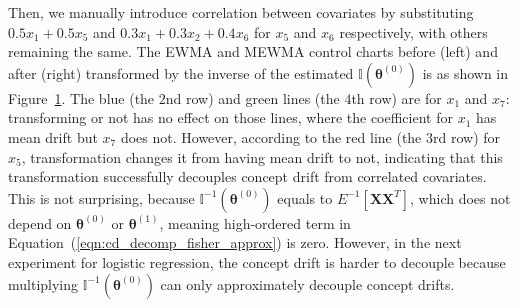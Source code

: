 \documentclass[twoside,11pt]{article}
\begin{document}
\begin{appendix}
\begin{figure}[!htbp]
  \label{fig:lin_reg_not_ind_X}
\end{figure}
Then, we manually introduce correlation between {covariates} by substituting $0.5 x_1 + 0.5 x_5$ and $ 0.3 x_1 + 0.3 x_2 + 0.4 x_6$ for $x_5$ and $x_6$ respectively, with others remaining the same. The EWMA and MEWMA control charts before (left) and after (right) transformed by {the inverse of the estimated} ${\mathbb {I}}(\bm { \theta}^{(0)})$ is as shown in Figure~\ref{fig:lin_reg_not_ind_X}. The blue (the $2$nd row) and green lines (the $4$th row) are for $x_1$ and $x_7$: transforming or not has no effect on those lines, where the coefficient for $x_1$ has mean {drift} but $x_7$ does not. However, according to the red line (the $3$rd row) for $x_5$, transformation changes it from having mean {drift} to not, indicating that this transformation successfully decouples concept drift from correlated covariates. This is not surprising, because ${\mathbb {I}} ^{-1}(\bm { \theta}^{(0)})$ equals to $E ^{-1} [\bm {X}\bm {X}^T]$, which does not depend on $ \bm { \theta} ^{(0)}$ or $ \bm { \theta} ^{(1)}$, meaning high-ordered term in Equation~(\ref{eqn:cd_decomp_fisher_approx}) is zero. However, in the next experiment for logistic regression, the concept drift is harder to decouple because multiplying ${\mathbb {I}} ^{-1}(\bm { \theta}^{(0)})$ can only approximately decouple concept drifts.


\end{appendix}
\end{document}
